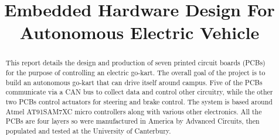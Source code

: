 \title{Embedded Hardware Design For Autonomous Electric Vehicle}

\author{

  \vspace{0.5\baselineskip}


  \vspace{0.5\baselineskip}


  \vspace{0.5\baselineskip}

}

\maketitle

\begin{abstract}
  This report details the design and production of seven printed circuit boards
  (PCBs) for the purpose of controlling an electric go-kart. The overall goal of
  the project is to build an autonomous go-kart that can drive itself around
  campus. Five of the PCBs communicate via a CAN bus to collect data and control
  other circuitry, while the other two PCBs control actuators for steering and
  brake control. The system is based around Atmel AT91SAM7XC micro controllers
  along with various other electronics. All the PCBs are four layers so were
  manufactured in America by Advanced Circuits, then populated and tested at the
  University of Canterbury.
\end{abstract}
